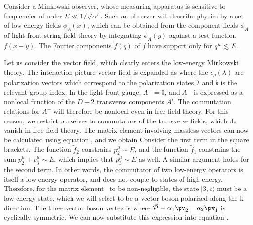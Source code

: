 Consider a Minkowski observer, whose measuring apparatus is sensitive
to frequencies of order $E \ll 1 / \sqrt{\alpha'}$.  Such an observer
will describe physics by a set of low-energy fields ${\hat \phi}_A
(x)$, which can be obtained from the component fields $\phi_A$ of
light-front string field theory by integrating $\phi_A(y)$ against a
test function $f(x-y)$.  The Fourier components ${\tilde f}(q)$ of
$f$ have support only for $q^{\mu} {\
\lower-1.2pt\vbox{\hbox{\rlap{$<$}\lower5pt\vbox{\hbox{$\sim$}}}}\ }
E$.

Let us consider the vector field, which clearly enters the low-energy
Minkowski theory.  The interaction picture vector field is expanded
as
\eqn{}
where the $\epsilon_{\mu}(\lambda)$ are polarization vectors which
correspond to the polarization states $\lambda$ and $b$ is the
relevant group index.  In the light-front
gauge, $A^+ = 0$, and $A^-$ is expressed as a nonlocal function of
the $D-2$ transverse components $A^i$.  The commutation relations for
$A^-$ will therefore be nonlocal even in free field theory.  For this
reason, we restrict ourselves to commutators of the transverse
fields, which do vanish in free field theory.  The matrix element
involving massless vectors can now be
calculated using equation \Mresult , and we obtain
\eqn{}
Consider the
first term in the square brackets.  The function ${\tilde f}_2$
constrains $p^{\mu}_2 \sim E$, and the function ${\tilde f}_1$
constrains the sum $p^{\mu}_2 + p^{\mu}_3 \sim E$, which
implies that $p^{\mu}_3 \sim E$ as well.  A similar argument
holds for the second term.  In other words, the commutator of two
low-energy operators is itself a low-energy operator, and does not
couple
to states of high energy.  Therefore, for the matrix element \Mlowen\
to be non-negligible, the state $|3,c\rangle$ must be a
low-energy state, which we will select to be a vector boson polarized
along the
k direction.  The three vector boson vertex is
\eqn{}
where ${\vec {\cal P}} = \alpha_1 \pv_2 - \alpha_2 \pv_1$ is
cyclically symmetric.  We can now substitute this expression into
equation \Mlowen .

